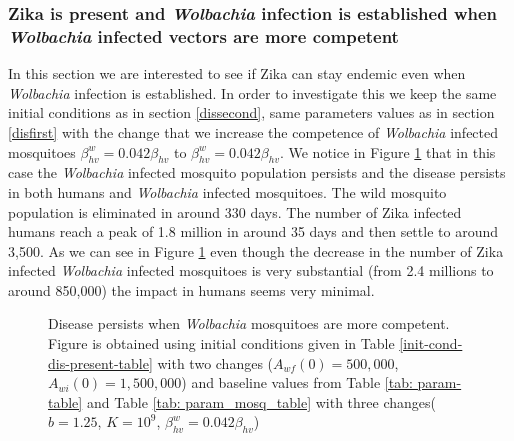 \documentclass{ws-rv9x6}
\begin{document}

\subsubsection{Zika is present and \textit{Wolbachia} infection is established when \textit{Wolbachia} infected vectors are more competent}\label{disthird}
In this section we are interested to see if Zika can stay endemic even when \textit{Wolbachia} infection is established. In order to investigate this we keep the same initial conditions as in section \ref{dissecond}, same parameters values as in section \ref{disfirst} with the change that we
increase the competence of \textit{Wolbachia} infected mosquitoes $\beta_{hv}^w=0.042\beta_{hv}$ to $\beta_{hv}^w=0.042\beta_{hv}$.  We notice in Figure \ref{sim6c} that in this case  the \textit{Wolbachia} infected mosquito population persists and the disease persists in both humans and \textit{Wolbachia} infected mosquitoes. The wild mosquito population is eliminated in around 330 days. The number of Zika infected humans reach a peak of 1.8 million in around 35 days and then settle to around 3,500. As we can see in Figure \ref{sim6c} even though the decrease in the number of Zika infected \textit{Wolbachia} infected mosquitoes is very substantial (from 2.4 millions to around 850,000) the impact in humans seems very minimal.

\begin{figure}[H]
\centering
    
    \makebox[0pt][l]{}%
    \makebox[0pt][l]{}%
    \makebox[0pt][l]{}%
    \caption{Disease persists when \textit{Wolbachia} mosquitoes are more competent. Figure is obtained using initial conditions given in Table \ref{init-cond-dis-present-table} with two changes ($A_{wf}(0)=500,000$, $A_{wi}(0)=1,500,000$)  and baseline values from Table \ref{tab: param-table} and Table \ref{tab: param_mosq_table}  with three changes($b=1.25$, $K=10^9$, $\beta_{hv}^w=0.042\beta_{hv}$)}
    \label{sim6c}
\end{figure}
\end{document}
